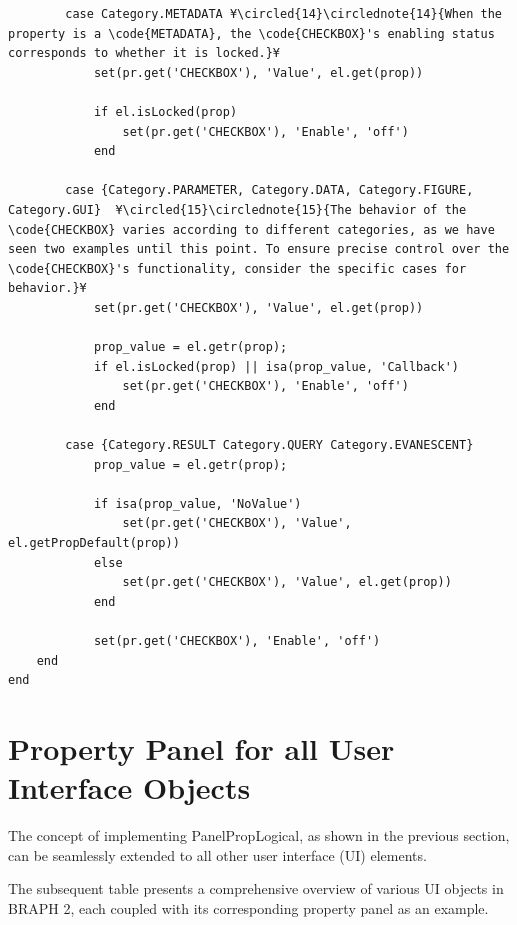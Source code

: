 \documentclass{tufte-handout}
\begin{document}
\begin{lstlisting}
        case Category.METADATA ¥\circled{14}\circlednote{14}{When the property is a \code{METADATA}, the \code{CHECKBOX}'s enabling status corresponds to whether it is locked.}¥
            set(pr.get('CHECKBOX'), 'Value', el.get(prop))

            if el.isLocked(prop)
                set(pr.get('CHECKBOX'), 'Enable', 'off')
            end
            
        case {Category.PARAMETER, Category.DATA, Category.FIGURE, Category.GUI}  ¥\circled{15}\circlednote{15}{The behavior of the \code{CHECKBOX} varies according to different categories, as we have seen two examples until this point. To ensure precise control over the \code{CHECKBOX}'s functionality, consider the specific cases for behavior.}¥
            set(pr.get('CHECKBOX'), 'Value', el.get(prop))

            prop_value = el.getr(prop);
            if el.isLocked(prop) || isa(prop_value, 'Callback')
                set(pr.get('CHECKBOX'), 'Enable', 'off')
            end
            
        case {Category.RESULT Category.QUERY Category.EVANESCENT}
            prop_value = el.getr(prop);

            if isa(prop_value, 'NoValue')
                set(pr.get('CHECKBOX'), 'Value', el.getPropDefault(prop))
            else
                set(pr.get('CHECKBOX'), 'Value', el.get(prop))
            end
            
            set(pr.get('CHECKBOX'), 'Enable', 'off')
    end
end

\end{lstlisting}



\clearpage

\section{Property Panel for all User Interface Objects}

The concept of implementing PanelPropLogical, as shown in the previous section, can be seamlessly extended to all other user interface (UI) elements.

The subsequent table presents a comprehensive overview of various UI objects in BRAPH 2, each coupled with its corresponding property panel as an example.
\end{document}
